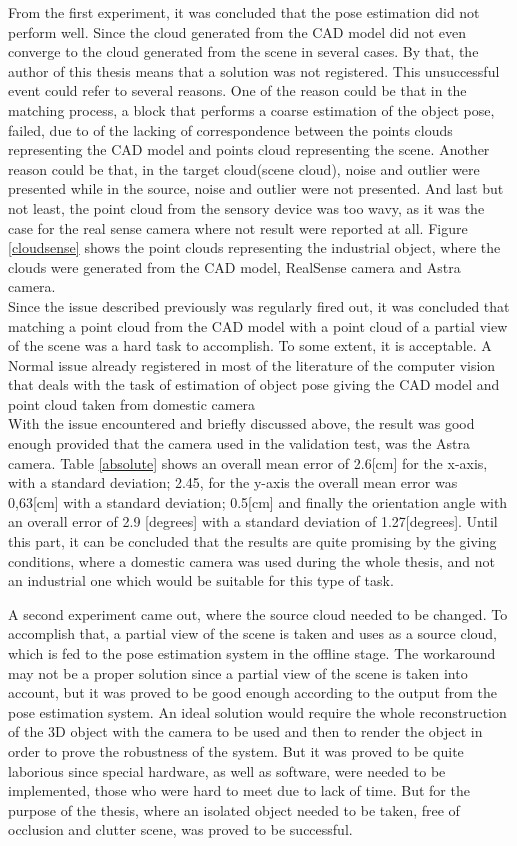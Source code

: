 From the first experiment, it was concluded that the pose estimation did not perform well. Since the cloud generated from the CAD model did not even converge to the cloud generated from the scene in several cases. By that, the author of this thesis means that a solution was not registered. This unsuccessful event could refer to several reasons. One of the reason could be that in the matching process, a block that performs a coarse estimation of the object pose, failed, due to of the lacking of correspondence between the points clouds representing the CAD model and points cloud representing the scene. Another reason could be that, in the target cloud(scene cloud), noise and outlier were presented while in the source, noise and outlier were not presented. And last but not least, the point cloud from the sensory device was too wavy, as it was the case for the real sense camera where not result were reported at all. Figure \ref{cloudsense} shows the point clouds representing the industrial object, where the clouds were generated from the CAD model, RealSense camera and Astra camera.\\
Since the issue described previously was regularly fired out, it was concluded that matching a point cloud from the CAD model with a point cloud of a partial view of the scene was a hard task to accomplish. To some extent, it is acceptable. A Normal issue already registered in most of the literature of the computer vision that deals with the task of estimation of object pose giving the CAD model and point cloud taken from domestic camera\\ 
With the issue encountered and briefly discussed above, the result was good enough provided that the camera used in the validation test, was the Astra camera. Table \ref{absolute}  shows an overall mean error of 2.6[cm] for the x-axis, with a standard deviation; 2.45, for the y-axis the overall mean error was 0,63[cm] with a standard deviation; 0.5[cm] and finally the orientation angle with an overall error of 2.9 [degrees] with a standard deviation of 1.27[degrees].  Until this part, it can be concluded that the results are quite promising by the giving conditions, where a domestic camera was used during the whole thesis, and not an industrial one which would be suitable for this type of task. 

A second experiment came out, where the source cloud needed to be changed. To accomplish that, a partial view of the scene is taken and uses as a source cloud, which is fed to the pose estimation system in the offline stage. The workaround may not be a proper solution since a partial view of the scene is taken into account, but it was proved to be good enough according to the output from the pose estimation system. An ideal solution would require the whole reconstruction of the 3D object with the camera to be used and then to render the object in order to prove the robustness of the system. But it was proved to be quite laborious since special hardware, as well as software, were needed to be implemented, those who were hard to meet due to lack of time. But for the purpose of the thesis, where an isolated object needed to be taken, free of occlusion and clutter scene, was proved to be successful.

